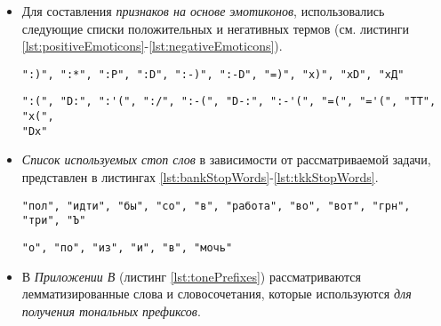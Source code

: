     \begin{itemize}
        \item Для составления {\it признаков на основе эмотиконов}, использовались следующие
        списки положительных и негативных термов (см. листинги
        \ref{lst:positiveEmoticons}-\ref{lst:negativeEmoticons}).

        \begin{lstlisting}[caption="Список положительных эмотиконов", label={lst:positiveEmoticons}]
":)", ":*", ":P", ":D", ":-)", ":-D", "=)", "x)", "xD", "хД"
        \end{lstlisting}
        \begin{lstlisting}[caption="Список негативных эмотиконов", label={lst:negativeEmoticons}]
":(", "D:", ":'(", ":/", ":-(", "D-:", ":-'(", "=(", "='(", "TT", "x(",
"Dx"
        \end{lstlisting}

        \item {\it Список используемых стоп слов} в зависимости от рассматриваемой задачи,
            представлен в листингах \ref{lst:bankStopWords}-\ref{lst:tkkStopWords}.

        \begin{lstlisting}[caption="Список стоп слов для задачи {\it BANK}", label={lst:bankStopWords}]
"пол", "идти", "бы", "со", "в", "работа", "во", "вот", "грн", "три", "Ъ"
        \end{lstlisting}

        \begin{lstlisting}[caption="Список стоп слов для задачи {\it TKK}", label={lst:tkkStopWords}]
"о", "по", "из", "и", "в", "мочь"
        \end{lstlisting}

        \item В {\it Приложении В} (листинг \ref{lst:tonePrefixes})
            рассматриваются лемматизированные слова и словосочетания, которые
            используются {\it для получения тональных префиксов}.
    \end{itemize}

